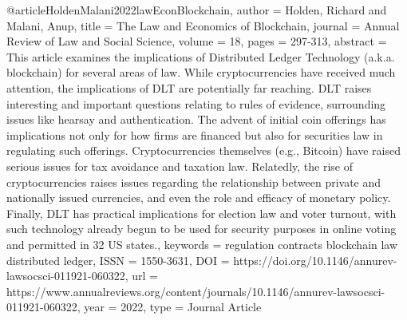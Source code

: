 {{{@article{HoldenMalani2022lawEconBlockchain,
   author = {Holden, Richard and Malani, Anup},
   title = {The Law and Economics of Blockchain},
   journal = {Annual Review of Law and Social Science},
   volume = {18},
   pages = {297-313},
   abstract = {This article examines the implications of Distributed Ledger Technology (a.k.a. blockchain) for several areas of law. While cryptocurrencies have received much attention, the implications of DLT are potentially far reaching. DLT raises interesting and important questions relating to rules of evidence, surrounding issues like hearsay and authentication. The advent of initial coin offerings has implications not only for how firms are financed but also for securities law in regulating such offerings. Cryptocurrencies themselves (e.g., Bitcoin) have raised serious issues for tax avoidance and taxation law. Relatedly, the rise of cryptocurrencies raises issues regarding the relationship between private and nationally issued currencies, and even the role and efficacy of monetary policy. Finally, DLT has practical implications for election law and voter turnout, with such technology already begun to be used for security purposes in online voting and permitted in 32 US states.},
   keywords = {regulation
contracts
blockchain
law
distributed ledger},
   ISSN = {1550-3631},
   DOI = {https://doi.org/10.1146/annurev-lawsocsci-011921-060322},
   url = {https://www.annualreviews.org/content/journals/10.1146/annurev-lawsocsci-011921-060322},
   year = {2022},
   type = {Journal Article}
}

}}}
